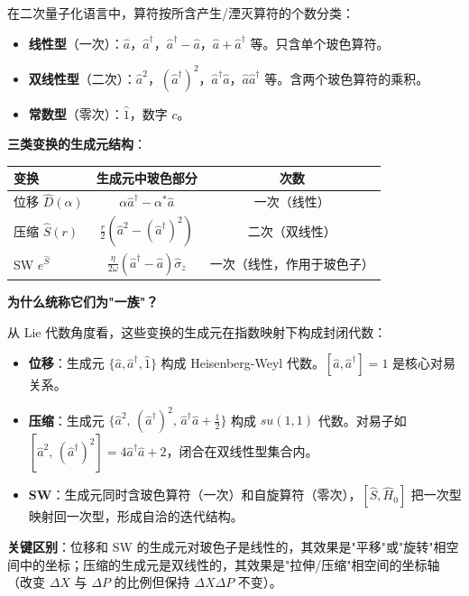 \begin{insightbox}
在二次量子化语言中，算符按所含产生/湮灭算符的个数分类：
\begin{itemize}[nosep]
\item \textbf{线性型}（一次）：$\hat{a}$，$\hat{a}^\dagger$，$\hat{a}^\dagger-\hat{a}$，$\hat{a}+\hat{a}^\dagger$ 等。只含单个玻色算符。
\item \textbf{双线性型}（二次）：$\hat{a}^2$，$(\hat{a}^\dagger)^2$，$\hat{a}^\dagger\hat{a}$，$\hat{a}\hat{a}^\dagger$ 等。含两个玻色算符的乘积。
\item \textbf{常数型}（零次）：$\hat{1}$，数字 $c$。
\end{itemize}

\textbf{三类变换的生成元结构}：
\begin{center}
\renewcommand{\arraystretch}{1.3}
\begin{tabular}{lcc}
\toprule
\textbf{变换} & \textbf{生成元中玻色部分} & \textbf{次数} \\
\midrule
位移 $\hat{D}(\alpha)$ & $\alpha\hat{a}^\dagger-\alpha^*\hat{a}$ & 一次（线性） \\
压缩 $\hat{S}(r)$ & $\frac{r}{2}(\hat{a}^2-(\hat{a}^\dagger)^2)$ & 二次（双线性） \\
SW $e^{\hat{S}}$ & $\frac{\eta}{2\omega}(\hat{a}^\dagger-\hat{a})\hat{\sigma}_z$ & 一次（线性，作用于玻色子） \\
\bottomrule
\end{tabular}
\end{center}

\textbf{为什么统称它们为"一族"？}

从 Lie 代数角度看，这些变换的生成元在指数映射下构成封闭代数：
\begin{itemize}[nosep]
\item \textbf{位移}：生成元 $\{\hat{a},\hat{a}^\dagger,\hat{1}\}$ 构成 Heisenberg-Weyl 代数。$[\hat{a},\hat{a}^\dagger]=1$ 是核心对易关系。
\item \textbf{压缩}：生成元 $\{\hat{a}^2,\,(\hat{a}^\dagger)^2,\,\hat{a}^\dagger\hat{a}+\frac12\}$ 构成 $su(1,1)$ 代数。对易子如 $[\hat{a}^2,\,(\hat{a}^\dagger)^2]=4\hat{a}^\dagger\hat{a}+2$，闭合在双线性型集合内。
\item \textbf{SW}：生成元同时含玻色算符（一次）和自旋算符（零次），$[\hat{S},\hat{H}_0]$ 把一次型映射回一次型，形成自洽的迭代结构。
\end{itemize}

\textbf{关键区别}：位移和 SW 的生成元对玻色子是线性的，其效果是"平移"或"旋转"相空间中的坐标；压缩的生成元是双线性的，其效果是"拉伸/压缩"相空间的坐标轴（改变 $\Delta X$ 与 $\Delta P$ 的比例但保持 $\Delta X\Delta P$ 不变）。
\end{insightbox}

